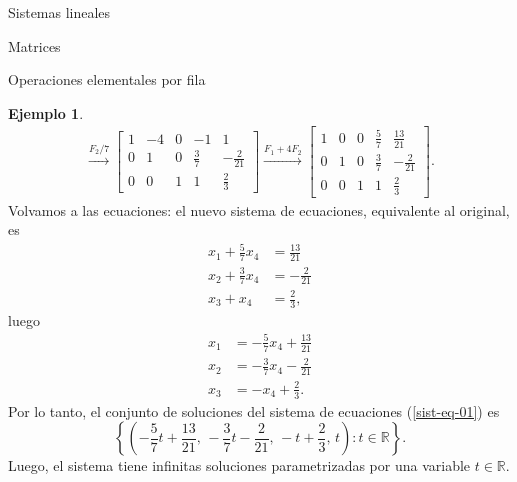 \documentclass[a4paper,12pt,twoside,spanish]{amsbook}
\theoremstyle{definition}
\newtheorem{ejemplo}{Ejemplo}[section]
\theoremstyle{remark}
\newcommand{\R}{\mathbb R}
\begin{document}
\begin{chapter}{Sistemas lineales}
\begin{section}{Matrices}
\begin{subsection}{Operaciones elementales por fila}
\begin{ejemplo}
\begin{multline*}
					\stackrel{F_2/7}{\longrightarrow} 
					\left[\begin{array}{cccc|c}  1&-4 &0&-1&1\\ 0& 1&0& \frac37&-\frac{2}{21}\\ 0&0&1&1&\frac{2}{3}\end{array}\right]
					\stackrel{F_1 +4F_2}{\longrightarrow} 
					\left[\begin{array}{cccc|c} 1&0&0&\frac{5}{7}&\frac{13}{21}\\0&1&0&\frac37&-\frac{2}{21} \\ 0&0&1&1&\frac{2}{3}\end{array}\right].
					\end{multline*}
					Volvamos a las ecuaciones: el nuevo sistema de ecuaciones, equivalente al original, es
					\begin{align*}
					x_1 +\frac{5}{7}x_4 &= \frac{13}{21} \\
					x_2 + \frac{3}{7}x_4 &=-\frac{2}{21} \\
					x_3 +x_4 &= \frac{2}{3}, 
					\end{align*}
					luego 
					\begin{align*}
					x_1  &=-\frac{5}{7}x_4 + \frac{13}{21}\\
					x_2  &=- \frac{3}{7}x_4 -\frac{2}{21} \\
					x_3  &= -x_4+\frac{2}{3}. 
					\end{align*}
					Por lo tanto, el conjunto de soluciones del sistema de ecuaciones (\ref{sist-eq-01}) es
					$$
					\left\{(-\frac{5}{7}t+ \frac{13}{21},\,- \frac{3}{7}t-\frac{2}{21},\, -t+\frac{2}{3},\,t): t \in \R \right\}.
					$$
					Luego, el sistema tiene infinitas soluciones parametrizadas por una variable $t \in \R$.
				\end{ejemplo}
				

\end{subsection}
\end{section}
\end{chapter}
\end{document}
